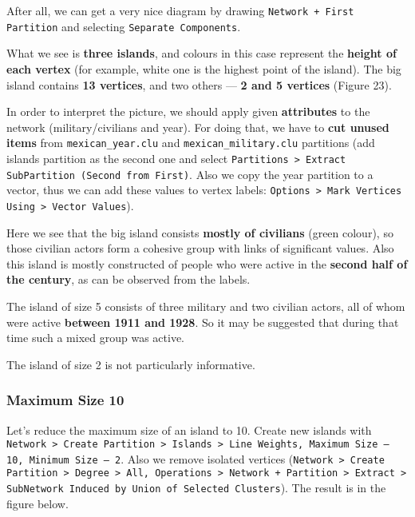 \FloatBarrier

After all, we can get a very nice diagram by drawing \texttt{Network + First Partition} and selecting \texttt{Separate Components}.


What we see is \textbf{three islands}, and colours in this case represent the \textbf{height of each vertex} (for example, white one is the highest point of the island). The big island contains \textbf{13 vertices}, and two others — \textbf{2 and 5 vertices} (Figure 23).  


In order to interpret the picture, we should apply given \textbf{attributes} to the network (military/civilians and year). For doing that, we have to \textbf{cut unused items} from \texttt{mexican\_year.clu} and \texttt{mexican\_military.clu} partitions (add islands partition as the second one and select \texttt{Partitions > Extract SubPartition (Second from First)}. Also we copy the year partition to a vector, thus we can add these values to vertex labels: \texttt{Options > Mark Vertices Using > Vector Values}).


\FloatBarrier

Here we see that the big island consists \textbf{mostly of civilians} (green colour), so those civilian actors form a cohesive group with links of significant values. Also this island is mostly constructed of people who were active in the \textbf{second half of the century}, as can be observed from the labels.

The island of size 5 consists of three military and two civilian actors, all of whom were active \textbf{between 1911 and 1928}. So it may be suggested that during that time such a mixed group was active.

The island of size 2 is not particularly informative.
\clearpage



\subsubsection{Maximum Size 10}
Let’s reduce the maximum size of an island to 10. Create new islands with \texttt{Network > Create Partition > Islands > Line Weights, Maximum Size — 10, Minimum Size — 2}. Also we remove isolated vertices (\texttt{Network > Create Partition > Degree > All, Operations > Network + Partition > Extract > SubNetwork Induced by Union of Selected Clusters}). The result is in the figure below.

